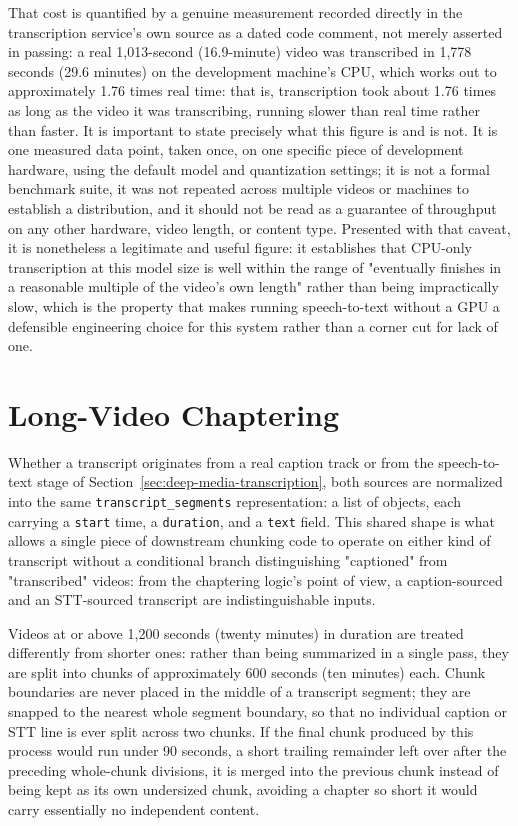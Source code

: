 That cost is quantified by a genuine measurement recorded directly in the transcription service's own source as a dated code comment, not merely asserted in passing: a real 1{,}013-second (16.9-minute) video was transcribed in 1{,}778 seconds (29.6 minutes) on the development machine's CPU, which works out to approximately 1.76 times real time: that is, transcription took about 1.76 times as long as the video it was transcribing, running slower than real time rather than faster. It is important to state precisely what this figure is and is not. It is one measured data point, taken once, on one specific piece of development hardware, using the default model and quantization settings; it is not a formal benchmark suite, it was not repeated across multiple videos or machines to establish a distribution, and it should not be read as a guarantee of throughput on any other hardware, video length, or content type. Presented with that caveat, it is nonetheless a legitimate and useful figure: it establishes that CPU-only transcription at this model size is well within the range of "eventually finishes in a reasonable multiple of the video's own length" rather than being impractically slow, which is the property that makes running speech-to-text without a GPU a defensible engineering choice for this system rather than a corner cut for lack of one.

\section{Long-Video Chaptering}
\label{sec:deep-media-chaptering}

Whether a transcript originates from a real caption track or from the speech-to-text stage of Section~\ref{sec:deep-media-transcription}, both sources are normalized into the same \texttt{transcript\_segments} representation: a list of objects, each carrying a \texttt{start} time, a \texttt{duration}, and a \texttt{text} field. This shared shape is what allows a single piece of downstream chunking code to operate on either kind of transcript without a conditional branch distinguishing "captioned" from "transcribed" videos: from the chaptering logic's point of view, a caption-sourced and an STT-sourced transcript are indistinguishable inputs.

Videos at or above 1{,}200 seconds (twenty minutes) in duration are treated differently from shorter ones: rather than being summarized in a single pass, they are split into chunks of approximately 600 seconds (ten minutes) each. Chunk boundaries are never placed in the middle of a transcript segment; they are snapped to the nearest whole segment boundary, so that no individual caption or STT line is ever split across two chunks. If the final chunk produced by this process would run under 90 seconds, a short trailing remainder left over after the preceding whole-chunk divisions, it is merged into the previous chunk instead of being kept as its own undersized chunk, avoiding a chapter so short it would carry essentially no independent content.

